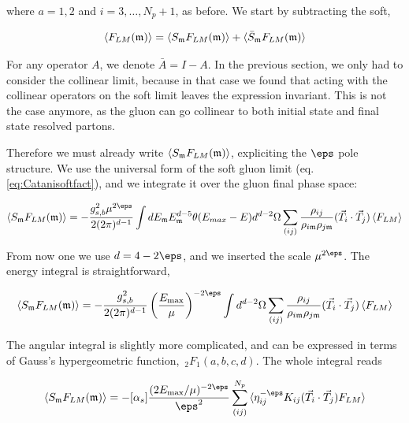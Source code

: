 \documentclass[11pt]{report}
\begin{document}
where \(a = 1, 2\) and \(i = 3, \ldots, N_p +1\), as before. We start by subtracting the soft, 

\begin{align}
    \braket{F_{LM}(\mathfrak{m})} = \braket{S_{\mathfrak{m}}F_{LM}(\mathfrak{m})} + \braket{\bar{S}_{\mathfrak{m}}F_{LM}(\mathfrak{m})}
\end{align}

For any operator \(A\), we denote \(\bar{A} = I -A\). In the previous section, we only had to consider the collinear limit, because in that case we found that acting with the collinear operators on the soft limit leaves the expression invariant. This is not the case anymore, as the gluon can go collinear to both initial state and final state resolved partons.  

Therefore we must already write \(\braket{S_{\mathfrak{m}}F_{LM}(\mathfrak{m})}\), expliciting the \(\eps\) pole structure. We use the universal form of the soft gluon limit (eq. \ref{eq:Catanisoftfact}), and we integrate it over the gluon final phase space: 

\begin{align}
    \braket{S_{\mathfrak{m}}F_{LM}(\mathfrak{m})} = -\frac{g_{s, b}^2\mu^{2\eps}}{2(2\pi)^{d-1}}\int dE_{\mathfrak{m}} E_{\mathfrak{m}}^{d-5}\theta(E_{max} - E)d^{d-2}\Omega \sum_{(ij)}\frac{\rho_{ij}}{\rho_{i\mathfrak{m}}\rho_{j\mathfrak{m}}}(\vec{T}_i \cdot \vec{T}_j)\braket{F_{LM}}
\end{align}

From now one we use \(d = 4-2\eps\), and we inserted the scale \(\mu^{2\eps}\). The energy integral is straightforward,

\begin{align}
    \braket{S_{\mathfrak{m}}F_{LM}(\mathfrak{m})} = -\frac{g_{s, b}^2}{2(2\pi)^{d-1}}\left( \frac{E_{\max}}{\mu}\right)^{-2\eps}\int d^{d-2}\Omega \sum_{(ij)}\frac{\rho_{ij}}{\rho_{i\mathfrak{m}}\rho_{j\mathfrak{m}}}(\vec{T}_i \cdot \vec{T}_j)\braket{F_{LM}}
\end{align}

The angular integral is slightly more complicated, and can be expressed in terms of Gauss's hypergeometric function, \(\, _2F_1(a, b, c,d)\). The whole integral reads 

\begin{align}
    \label{eq:intsoftlimNLO}
    \braket{S_{\mathfrak{m}}F_{LM}(\mathfrak{m})} = -[\alpha_s]\frac{(2E_{\max}/\mu)^{-2\eps}}{\eps^2}\sum_{(ij)}^{N_p}\braket{\eta_{ij}^{-\eps}K_{ij}(\vec{T}_i \cdot \vec{T}_j)F_{LM}}
\end{align}
\end{document}
